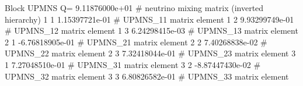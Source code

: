 Block UPMNS Q= 9.11876000e+01 # neutrino mixing matrix (inverted  hierarchy)
  1  1     1.15397721e-01   # UPMNS_{11} matrix element
  1  2     9.93299749e-01   # UPMNS_{12} matrix element
  1  3     6.24298415e-03   # UPMNS_{13} matrix element
  2  1    -6.76818905e-01   # UPMNS_{21} matrix element
  2  2     7.40268838e-02   # UPMNS_{22} matrix element
  2  3     7.32418044e-01   # UPMNS_{23} matrix element
  3  1     7.27048510e-01   # UPMNS_{31} matrix element
  3  2    -8.87447430e-02   # UPMNS_{32} matrix element
  3  3     6.80826582e-01   # UPMNS_{33} matrix element
